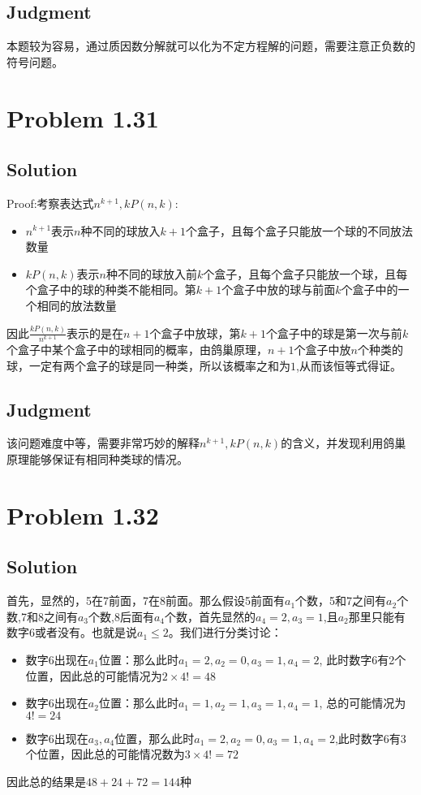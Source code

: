 \documentclass[a4paper]{ctexart}
\begin{document}
\subsection{Judgment}
本题较为容易，通过质因数分解就可以化为不定方程解的问题，需要注意正负数的符号问题。
\section{Problem 1.31}
\subsection{Solution}
Proof:考察表达式$n^{k+1}, kP(n,k)$:
\begin{itemize}
    \item $n^{k+1}$表示$n$种不同的球放入$k+1$个盒子，且每个盒子只能放一个球的不同放法数量
    \item $kP(n,k)$表示$n$种不同的球放入前$k$个盒子，且每个盒子只能放一个球，且每个盒子中的球的种类不能相同。第$k+1$个盒子中放的球与前面$k$个盒子中的一个相同的放法数量
\end{itemize}
因此$\frac{kP(n,k)}{n^{k+1}}$表示的是在$n+1$个盒子中放球，第$k+1$个盒子中的球是第一次与前$k$个盒子中某个盒子中的球相同的概率，由鸽巢原理，$n+1$个盒子中放$n$个种类的球，一定有两个盒子的球是同一种类，所以该概率之和为$1$,从而该恒等式得证。
\subsection{Judgment}
该问题难度中等，需要非常巧妙的解释$n^{k+1}, kP(n,k)$的含义，并发现利用鸽巢原理能够保证有相同种类球的情况。
\section{Problem 1.32}
\subsection{Solution}
首先，显然的，5在7前面，7在8前面。那么假设5前面有$a_1$个数，5和7之间有$a_2$个数,7和8之间有$a_3$个数,8后面有$a_4$个数，首先显然的$a_4=2,a_3=1$,且$a_2$那里只能有数字$6$或者没有。也就是说$a_1\leq 2$。我们进行分类讨论：
\begin{itemize}
    \item 数字6出现在$a_1$位置：那么此时$a_1=2,a_2=0,a_3=1,a_4=2$, 此时数字6有2个位置，因此总的可能情况为$2\times 4!=48$
    \item 数字6出现在$a_2$位置：那么此时$a_1=1,a_2=1,a_3=1,a_4=1$, 总的可能情况为$4!=24$
    \item 数字6出现在$a_3,a_4$位置，那么此时$a_1=2,a_2=0,a_3=1,a_4=2$,此时数字6有3个位置，因此总的可能情况数为$3\times 4!=72$
\end{itemize}
因此总的结果是$48+24+72=144$种
\end{document}
